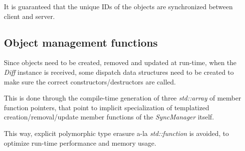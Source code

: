 \documentclass{report}
\begin{document}
                It is guaranteed that the unique IDs of the objects are synchronized between client and server.

            \subsection{Object management functions}

                Since objects need to be created, removed and updated at run-time, when the \emph{Diff} instance is received, some dispatch data structures need to be created to make sure the correct constructors/destructors are called.

                This is done through the compile-time generation of three \emph{std::array} of member function pointers, that point to implicit specialization of templatized creation/removal/update member functions of the \emph{SyncManager} itself.

                This way, explicit polymorphic type erasure a-la \emph{std::function} is avoided, to optimize run-time performance and memory usage.
\end{document}
